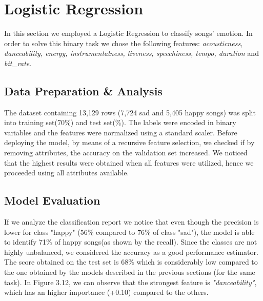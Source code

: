 \newpage
\section{Logistic Regression}
In this section we employed a Logistic Regression to classify songs' emotion. In order to solve this binary task we chose the following features: \textit{acousticness, danceability, energy, instrumentalness, liveness, speechiness, tempo, duration} and \textit{bit\_rate}. 

\subsection{Data Preparation \& Analysis}

The dataset containing 13,129 rows (7,724 sad and 5,405 happy songs) was split into training set(70\%) and test set(\%). The labels were encoded in binary variables and the features were normalized using a standard scaler. Before deploying the model, by means of a recursive feature selection, we checked if by removing attributes, the accuracy on the validation set increased. We noticed that the highest results were obtained when all features were utilized, hence we proceeded using all attributes available. 
\subsection{Model Evaluation}
If we analyze the classification report we notice that even though the precision is lower for class "happy" (56\% compared to 76\% of class "sad"), the model is able to identify 71\% of happy songs(as shown by the recall). Since the classes are not highly unbalanced, we considered the accuracy as a good performance estimator. The score obtained on the test set is 68\% which is considerably low compared to the one obtained by the models described in the previous sections (for the same task). In Figure 3.12, we can observe that the strongest feature is \textit{"danceability"}, which has an higher importance (+0.10) compared to the others.

